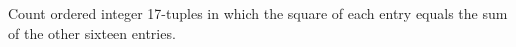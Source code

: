 Count ordered integer 17-tuples in which the square of each entry equals the sum of the other sixteen entries.
